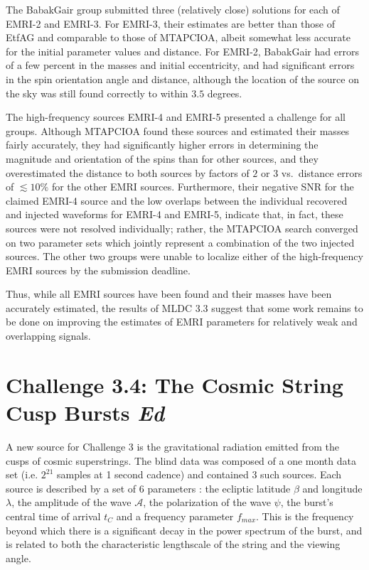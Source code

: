 \documentclass{iopart}
\begin{document}
The BabakGair group submitted three (relatively close) solutions for each of EMRI-2 and EMRI-3.  For EMRI-3, their estimates are better than those of EtfAG and comparable to those of MTAPCIOA, albeit somewhat less accurate for the initial parameter values and distance.  For EMRI-2, BabakGair had errors of a few percent in the masses and initial eccentricity, and had significant errors in the spin orientation angle and distance, although the location of the source on the sky was still found correctly to within $3.5$ degrees.

The high-frequency sources EMRI-4 and EMRI-5 presented a challenge for all groups.  Although MTAPCIOA found these sources and estimated their masses fairly accurately, they had significantly higher errors in determining the magnitude and orientation of the spins than for other sources, and they overestimated the distance to both sources by factors of $2$ or $3$ vs.~distance errors of $\lesssim 10\%$ for the other EMRI sources.  Furthermore, their negative SNR for the claimed EMRI-4 source and the low overlaps between the individual recovered and injected waveforms for EMRI-4 and EMRI-5, indicate that, in fact, these sources were not resolved individually; rather, the MTAPCIOA search converged on two parameter sets which jointly represent a combination of the two injected sources.   The other two groups were unable to localize either of the high-frequency EMRI sources by the submission deadline.

Thus, while all EMRI sources have been found and their masses have been accurately estimated, the results of MLDC 3.3 suggest that some work remains to be done on improving the estimates of EMRI parameters for relatively weak and overlapping signals.


\section{Challenge 3.4: The Cosmic String Cusp Bursts {\it Ed}}

A new source for Challenge 3 is the gravitational radiation emitted from the cusps of cosmic superstrings.  The blind data was composed of a one month data set (i.e. $2^{21}$ samples at 1 second cadence) and contained 3 such sources.  Each source is described
by a set of 6 parameters : the ecliptic latitude $\beta$ and longitude $\lambda$, the amplitude of the wave ${\mathcal A}$, the polarization of the wave $\psi$, the burst's
central time of arrival $t_C$ and a frequency parameter $f_{max}$.  This is the frequency beyond which there is a significant decay in the power spectrum of the burst, and is related to both the characteristic lengthscale of the string and the viewing angle.
\end{document}
